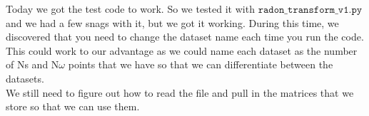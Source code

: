 
Today we got the test code to work. So we tested it with $\texttt{radon\_transform\_v1.py}$ and we had a few snags with it, but we got it working. During this time, we discovered that you need to change the dataset name each time you run the code. This could work to our advantage as we could name each dataset as the number of Ns and N$\omega$ points that we have so that we can differentiate between the datasets. \\
We still need to figure out how to read the file and pull in the matrices that we store so that we can use them.
